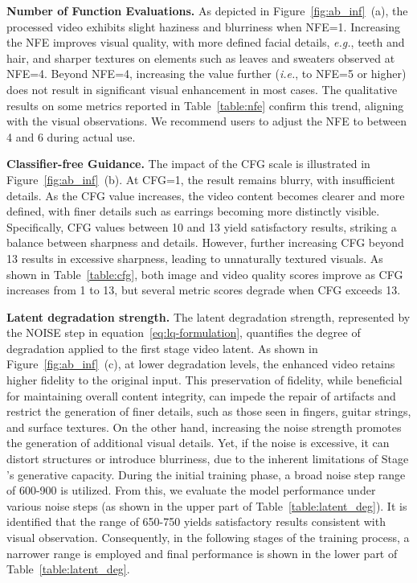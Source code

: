 \noindent \textbf{Number of Function Evaluations.} As depicted in Figure~\ref{fig:ab_inf}~(a), the processed video exhibits slight haziness and blurriness when NFE=1. Increasing the NFE improves visual quality, with more defined facial details, \textit{e.g.}, teeth and hair, and sharper textures on elements such as leaves and sweaters observed at NFE=4. Beyond NFE=4, increasing the value further (\textit{i.e.}, to NFE=5 or higher) does not result in significant visual enhancement in most cases. The qualitative results on some metrics reported in Table~\ref{table:nfe} confirm this trend, aligning with the visual observations. We recommend users to adjust the NFE to between 4 and 6 during actual use.

\noindent \textbf{Classifier-free Guidance.} The impact of the CFG scale is illustrated in Figure~\ref{fig:ab_inf}~(b). At CFG=1, the result remains blurry, with insufficient details. As the CFG value increases, the video content becomes clearer and more defined, with finer details such as earrings becoming more distinctly visible. Specifically, CFG values between 10 and 13 yield satisfactory results, striking a balance between sharpness and details. However, further  increasing CFG beyond 13 results in excessive sharpness, leading to unnaturally textured visuals. As shown in Table~\ref{table:cfg}, both image and video quality scores improve as CFG increases from 1 to 13, but several metric scores degrade when CFG exceeds 13.

\noindent \textbf{Latent degradation strength.} 
The latent degradation strength, represented by the NOISE step in equation~\ref{eq:lq-formulation}, quantifies the degree of degradation applied to the first stage  video latent. As shown in Figure~\ref{fig:ab_inf}~(c), at lower degradation levels, the enhanced video retains higher fidelity to the original input. This preservation of fidelity, while beneficial for maintaining overall content integrity, can impede the repair of artifacts and restrict the generation of finer details, such as those seen in fingers, guitar strings, and surface textures. On the other hand, increasing the noise strength promotes the generation of additional visual details. Yet, if the noise is excessive, it can distort structures or introduce blurriness, due to the inherent limitations of Stage 's generative capacity.  During the initial training phase, a broad noise step range of 600-900 is utilized. From this, we evaluate the model performance under various noise steps (as shown in the upper  part of  Table~\ref{table:latent_deg}). It is identified that the range of 650-750 yields satisfactory results consistent with visual observation. Consequently, in the following stages of the training process, a narrower range is employed and final performance is shown in the  lower part of Table~\ref{table:latent_deg}.
 
